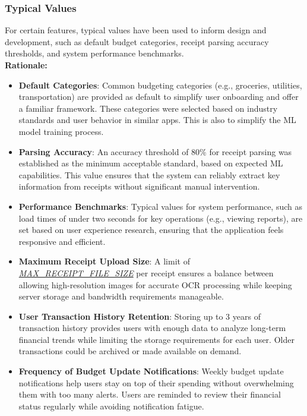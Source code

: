 \documentclass[12pt]{article}
\begin{document}
\subsubsection{Typical Values}
For certain features, typical values have been used to inform design and development, such as default budget categories, receipt parsing accuracy thresholds, and system performance benchmarks.\\

\noindent\textbf{Rationale:}
\begin{itemize}
    \item \textbf{Default Categories}: Common budgeting categories (e.g.,
    groceries, utilities, transportation) are provided as default to simplify
    user onboarding and offer a familiar framework. These categories were
    selected based on industry standards and user behavior in similar apps. This
    is also to simplify the ML model training process.
    \item \textbf{Parsing Accuracy}: An accuracy threshold of 80\% for receipt
    parsing was established as the minimum acceptable standard, based on
    expected ML capabilities. This value ensures that the system can reliably
    extract key information from receipts without significant manual
    intervention.
    \item \textbf{Performance Benchmarks}: Typical values for system
    performance, such as load times of under two seconds for key operations
    (e.g., viewing reports), are set based on user experience research, ensuring
    that the application feels responsive and efficient.
    \item \textbf{Maximum Receipt Upload Size}: A limit of \hyperref[Table:AuxConstants]{\textit{MAX\_RECEIPT\_FILE\_SIZE}} per receipt
    ensures a balance between allowing high-resolution images for accurate OCR
    processing while keeping server storage and bandwidth requirements
    manageable. 
    \item \textbf{User Transaction History Retention}: Storing up to 3 years of
    transaction history provides users with enough data to analyze long-term
    financial trends while limiting the storage requirements for each user.
    Older transactions could be archived or made available on demand.
    \item \textbf{Frequency of Budget Update Notifications}: Weekly budget
    update notifications help users stay on top of their spending without
    overwhelming them with too many alerts. Users are reminded to review their
    financial status regularly while avoiding notification fatigue.
\end{itemize}
\end{document}
